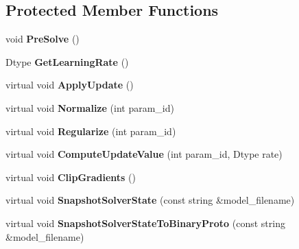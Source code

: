 \subsection*{Protected Member Functions}
\begin{DoxyCompactItemize}
\item 
void {\bfseries Pre\+Solve} ()\hypertarget{classcaffe_1_1SGDSolver_a6488286ff665df1907d64a92d4acf835}{}\label{classcaffe_1_1SGDSolver_a6488286ff665df1907d64a92d4acf835}

\item 
Dtype {\bfseries Get\+Learning\+Rate} ()\hypertarget{classcaffe_1_1SGDSolver_a985436c42815498163a3d74fdb64ee70}{}\label{classcaffe_1_1SGDSolver_a985436c42815498163a3d74fdb64ee70}

\item 
virtual void {\bfseries Apply\+Update} ()\hypertarget{classcaffe_1_1SGDSolver_a6a461fcea902238150520695c0b9afc5}{}\label{classcaffe_1_1SGDSolver_a6a461fcea902238150520695c0b9afc5}

\item 
virtual void {\bfseries Normalize} (int param\+\_\+id)\hypertarget{classcaffe_1_1SGDSolver_af6a4841b33eb75c327b57bbd9618d362}{}\label{classcaffe_1_1SGDSolver_af6a4841b33eb75c327b57bbd9618d362}

\item 
virtual void {\bfseries Regularize} (int param\+\_\+id)\hypertarget{classcaffe_1_1SGDSolver_a58c7580080ad737c214dd666c9314999}{}\label{classcaffe_1_1SGDSolver_a58c7580080ad737c214dd666c9314999}

\item 
virtual void {\bfseries Compute\+Update\+Value} (int param\+\_\+id, Dtype rate)\hypertarget{classcaffe_1_1SGDSolver_abed831880d7e91cccffba2283cb131a4}{}\label{classcaffe_1_1SGDSolver_abed831880d7e91cccffba2283cb131a4}

\item 
virtual void {\bfseries Clip\+Gradients} ()\hypertarget{classcaffe_1_1SGDSolver_af6843c11d78770721752379fd8c1f6d8}{}\label{classcaffe_1_1SGDSolver_af6843c11d78770721752379fd8c1f6d8}

\item 
virtual void {\bfseries Snapshot\+Solver\+State} (const string \&model\+\_\+filename)\hypertarget{classcaffe_1_1SGDSolver_a99abb8ec20584dda556e9700df425ed9}{}\label{classcaffe_1_1SGDSolver_a99abb8ec20584dda556e9700df425ed9}

\item 
virtual void {\bfseries Snapshot\+Solver\+State\+To\+Binary\+Proto} (const string \&model\+\_\+filename)\hypertarget{classcaffe_1_1SGDSolver_a86d3bc01f9262416cc3cac669993ea46}{}\label{classcaffe_1_1SGDSolver_a86d3bc01f9262416cc3cac669993ea46}


\end{DoxyCompactItemize}
